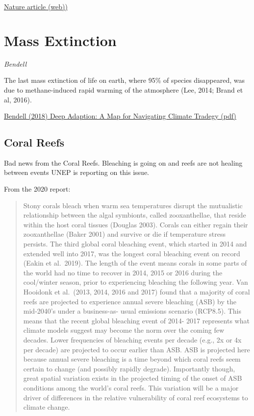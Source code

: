 \documentclass[
]{book}
\begin{document}
\href{https://www.nature.com/articles/s41893-020-00656-5}{Nature article (web))}

\hypertarget{mass-extinction}{%
\chapter{Mass Extinction}\label{mass-extinction}}

\emph{Bendell}

The last mass extinction of life on earth, where 95\% of species disappeared,
was due to methane-induced rapid warming of the atmosphere (Lee, 2014; Brand et al, 2016).

\href{pdf/\%20Bendell_2020_Deep_Adaptation.pdf}{Bendell (2018) Deep Adaption: A Map for Navigating Climate Tradegy (pdf)}

\hypertarget{coral-reefs}{%
\section{Coral Reefs}\label{coral-reefs}}

Bad news from the Coral Reefs.
Bleaching is going on and reefs are not healing between events
UNEP is reporting on this issue.

From the 2020 report:

\begin{quote}
Stony corals bleach when warm sea temperatures disrupt the mutualistic relationship between
the algal symbionts, called zooxanthellae, that reside within the host coral tissues (Douglas
2003). Corals can either regain their zooxanthellae (Baker 2001) and survive or die if
temperature stress persists. The third global coral bleaching event, which started in 2014 and
extended well into 2017, was the longest coral bleaching event on record (Eakin et al.~2019).
The length of the event means corals in some parts of the world had no time to recover in 2014,
2015 or 2016 during the cool/winter season, prior to experiencing bleaching the following year.
Van Hooidonk et al.~(2013, 2014, 2016 and 2017) found that a majority of coral reefs are
projected to experience annual severe bleaching (ASB) by the mid-2040's under a business-as-
usual emissions scenario (RCP8.5). This means that the recent global bleaching event of 2014-
2017 represents what climate models suggest may become the norm over the coming few
decades. Lower frequencies of bleaching events per decade (e.g., 2x or 4x per decade) are
projected to occur earlier than ASB. ASB is projected here because annual severe bleaching is a
time beyond which coral reefs seem certain to change (and possibly rapidly degrade).
Importantly though, great spatial variation exists in the projected timing of the onset of ASB
conditions among the world's coral reefs. This variation will be a major driver of differences in
the relative vulnerability of coral reef ecosystems to climate change.
\end{quote}
\end{document}

